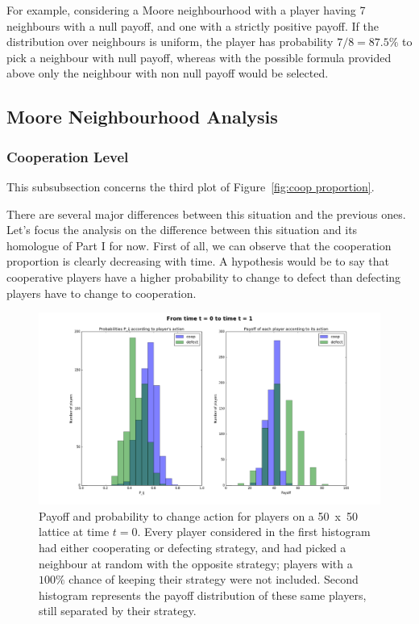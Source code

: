 \documentclass{article}
\begin{document}
For example, considering a Moore neighbourhood with a player having 7 neighbours with a null payoff, and
one with a strictly positive payoff. If the distribution over neighbours is uniform, the player has
probability $7/8 = 87.5\%$ to pick a neighbour with null payoff, whereas with the possible formula
provided above only the neighbour with non null payoff would be selected.

\subsection{Moore Neighbourhood Analysis}

\subsubsection{Cooperation Level}

This subsubsection concerns the third plot of Figure~\ref{fig:coop proportion}.

There are several major differences between this situation and the previous ones. Let's focus the analysis
on the difference between this situation and its homologue of Part I for now. First of all, we can observe
that the cooperation proportion is clearly decreasing with time. A hypothesis would be to say that cooperative
players have a higher probability to change to defect than defecting players have to change to cooperation.

\begin{figure}[!h]
\hspace{-1.8cm}
\includegraphics[width=1.2\textwidth]{imgs/part2_diff_coop_defect_0_to_1.png}
\vspace{-1cm}
\caption{Payoff and probability to change action for players on a 50~x~50 lattice at time $t=0$. Every
player considered in the first histogram had either cooperating or defecting strategy, and had picked a
neighbour at random with the opposite strategy; players with a $100\%$ chance of keeping their strategy
were not included. Second histogram represents the payoff distribution of these same players, still
separated by their strategy. \label{fig:Part II hists coop/defect Moore 0 to 1}}
\end{figure}
\end{document}
